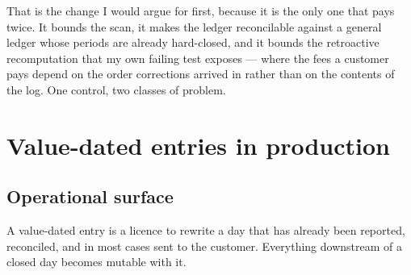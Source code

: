 \documentclass[10pt,a4paper]{article}
\begin{document}
That is the change I would argue for first, because it is the only one that
pays twice. It bounds the scan, it makes the ledger reconcilable against a
general ledger whose periods are already hard-closed, and it bounds the
retroactive recomputation that my own failing test exposes --- where the fees a
customer pays depend on the order corrections arrived in rather than on the
contents of the log. One control, two classes of problem.

\section{Value-dated entries in production}

\subsection{Operational surface}

A value-dated entry is a licence to rewrite a day that has already been
reported, reconciled, and in most cases sent to the customer. Everything
downstream of a closed day becomes mutable with it.
\end{document}

